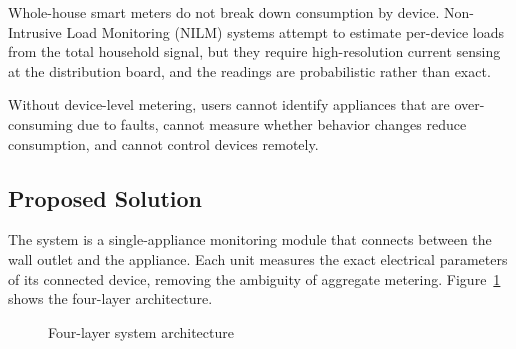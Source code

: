 \documentclass[12pt, a4paper]{article}
\begin{document}
	Whole-house smart meters do not break down consumption by device. Non-Intrusive Load Monitoring (NILM) systems attempt to estimate per-device loads from the total household signal, but they require high-resolution current sensing at the distribution board, and the readings are probabilistic rather than exact.
	
	Without device-level metering, users cannot identify appliances that are over-consuming due to faults, cannot measure whether behavior changes reduce consumption, and cannot control devices remotely.
	
	\subsection{Proposed Solution}
	
	The system is a single-appliance monitoring module that connects between the wall outlet and the appliance. Each unit measures the exact electrical parameters of its connected device, removing the ambiguity of aggregate metering. Figure~\ref{fig:layers} shows the four-layer architecture.
	
	\begin{figure}[H]
		\centering
		\caption{Four-layer system architecture}
		\label{fig:layers}
	\end{figure}
\end{document}
